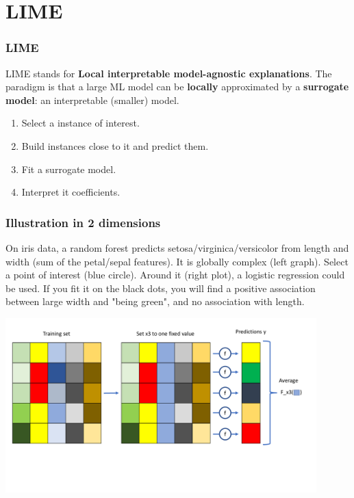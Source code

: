 \section{LIME}
\begin{frame}
\frametitle{LIME}
LIME stands for {\bf Local interpretable model-agnostic explanations}. The paradigm is that a large ML model can be {\bf locally} approximated by a {\bf surrogate model}: an interpretable (smaller) model. 
\begin{enumerate}
\item Select a instance of interest.
\item Build instances close to it and predict them.
\item Fit a surrogate model.
\item Interpret it coefficients.
\end{enumerate}
\end{frame}
\begin{frame}
\frametitle{Illustration in 2 dimensions}
\small
On iris data, a random forest predicts setosa/virginica/versicolor from length and width (sum of the petal/sepal features). It is globally complex (left graph). Select a point of interest (blue circle). Around it (right plot), a logistic regression could be used. If you fit it on the black dots, you will find a positive association between large width and "being green", and no association with length. 
\normalsize
\begin{center}
\includegraphics[width=12cm, page=2]{../Graphs/LIME_illustr.pdf}
\end{center}
\end{frame}
